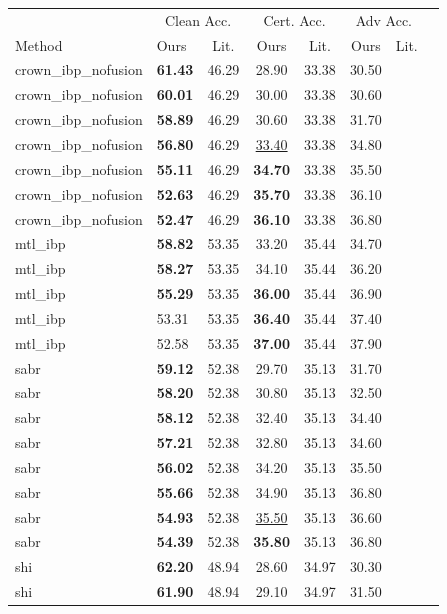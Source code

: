 \begin{tabular}{llcccccc}
\toprule
 & \multicolumn{2}{c}{Clean Acc.} & \multicolumn{2}{c}{Cert. Acc.} & \multicolumn{2}{c}{Adv Acc.} \\
Method & Ours & Lit. & Ours & Lit. & Ours & Lit. \\
\midrule
crown\_ibp\_nofusion & \textbf{61.43} & 46.29 & 28.90 & 33.38 & 30.50 & \\
crown\_ibp\_nofusion & \textbf{60.01} & 46.29 & 30.00 & 33.38 & 30.60 & \\
crown\_ibp\_nofusion & \textbf{58.89} & 46.29 & 30.60 & 33.38 & 31.70 & \\
crown\_ibp\_nofusion & \textbf{56.80} & 46.29 & \underline{33.40} & 33.38 & 34.80 & \\
crown\_ibp\_nofusion & \textbf{55.11} & 46.29 & \textbf{34.70} & 33.38 & 35.50 & \\
crown\_ibp\_nofusion & \textbf{52.63} & 46.29 & \textbf{35.70} & 33.38 & 36.10 & \\
crown\_ibp\_nofusion & \textbf{52.47} & 46.29 & \textbf{36.10} & 33.38 & 36.80 & \\
mtl\_ibp & \textbf{58.82} & 53.35 & 33.20 & 35.44 & 34.70 & \\
mtl\_ibp & \textbf{58.27} & 53.35 & 34.10 & 35.44 & 36.20 & \\
mtl\_ibp & \textbf{55.29} & 53.35 & \textbf{36.00} & 35.44 & 36.90 & \\
mtl\_ibp & 53.31 & 53.35 & \textbf{36.40} & 35.44 & 37.40 & \\
mtl\_ibp & 52.58 & 53.35 & \textbf{37.00} & 35.44 & 37.90 & \\
sabr & \textbf{59.12} & 52.38 & 29.70 & 35.13 & 31.70 & \\
sabr & \textbf{58.20} & 52.38 & 30.80 & 35.13 & 32.50 & \\
sabr & \textbf{58.12} & 52.38 & 32.40 & 35.13 & 34.40 & \\
sabr & \textbf{57.21} & 52.38 & 32.80 & 35.13 & 34.60 & \\
sabr & \textbf{56.02} & 52.38 & 34.20 & 35.13 & 35.50 & \\
sabr & \textbf{55.66} & 52.38 & 34.90 & 35.13 & 36.80 & \\
sabr & \textbf{54.93} & 52.38 & \underline{35.50} & 35.13 & 36.60 & \\
sabr & \textbf{54.39} & 52.38 & \textbf{35.80} & 35.13 & 36.80 & \\
shi & \textbf{62.20} & 48.94 & 28.60 & 34.97 & 30.30 & \\
shi & \textbf{61.90} & 48.94 & 29.10 & 34.97 & 31.50 & \\

\end{tabular}
